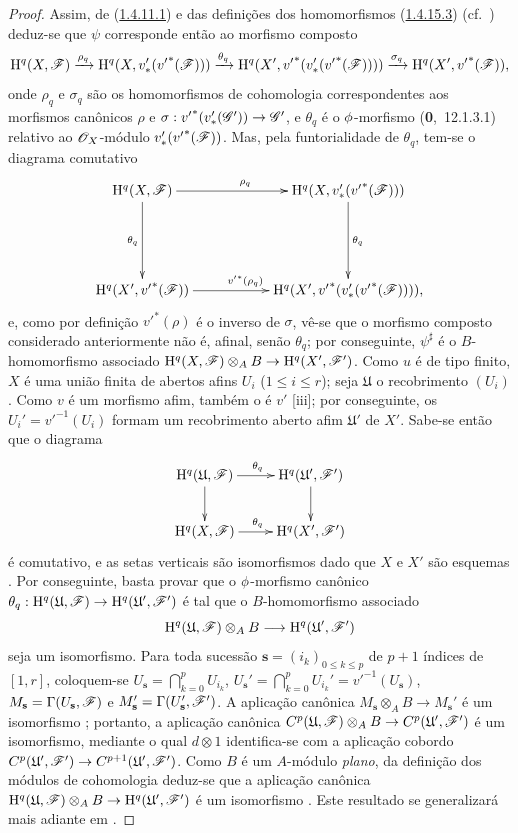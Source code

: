 \begin{proof}
Assim, de (\hyperref[III.1.4.11.1]{1.4.11.1}) e das definições dos homomorfismos (\hyperref[III.1.4.15.3]{1.4.15.3}) (cf.~) deduz-se que $\psi$ corresponde então ao morfismo composto
\[
  \mathrm{H}^q(X,\mathscr{F})\xrightarrow{\rho_q}\mathrm{H}^q(X,v_*'({v'}^*(\mathscr{F})))\xrightarrow{\theta_q}\mathrm{H}^q(X',{v'}^*(v_*'({v'}^*(\mathscr{F}))))\xrightarrow{\sigma_q}\mathrm{H}^q(X',{v'}^*(\mathscr{F})),
\]
onde $\rho_q$ e $\sigma_q$ são os homomorfismos de cohomologia correspondentes aos morfismos canônicos $\rho$ e $\sigma:{v'}^*(v_*'(\sh{G}'))\to\sh{G}'$, e $\theta_q$ é o $\phi$-morfismo (\textbf{0},~12.1.3.1) relativo ao $\mathscr{O}_X$-módulo $v_*'({v'}^*(\mathscr{F}))$.
Mas, pela funtorialidade de $\theta_q$, tem-se o diagrama comutativo
\[
  \xymatrix{
    \HH^q(X,\sh{F})\ar[rr]^{\rho_q}\ar[dd]_{\theta_q} & &
    \HH^q(X,v_*'({v'}^*(\sh{F})))\ar[dd]^{\theta_q}\\\\
    \HH^q(X',{v'}^*(\sh{F}))\ar[rr]^{{v'}^*(\rho_q)} & &
    \HH^q(X',{v'}^*(v_*'({v'}^*(\sh{F})))),
  }
\]
e, como por definição  ${v'}^*(\rho)$ é o inverso de $\sigma$, vê-se que o morfismo composto considerado anteriormente não é, afinal, senão $\theta_q$; por conseguinte, $\psi^\sharp$ é o $B$-homomorfismo associado $\HH^q(X,\sh{F})\otimes_A B\to\HH^q(X',\sh{F}')$.
Como $u$ é de tipo finito, $X$ é uma união finita de abertos afins $U_i$ ($1\leq i\leq r$); seja $\mathfrak{U}$ o recobrimento $(U_i)$.
Como $v$ é um morfismo afim, também o é $v'$ [iii]; por conseguinte, os $U_i'={v'}^{-1}(U_i)$ formam um recobrimento aberto afim $\mathfrak{U}'$ de $X'$.
Sabe-se então  que o diagrama
\[
  \xymatrix{
    \HH^q(\mathfrak{U},\sh{F})\ar[r]^{\theta_q}\ar[d] &
    \HH^q(\mathfrak{U}',\sh{F}')\ar[d]\\
    \HH^q(X,\sh{F})\ar[r]^{\theta_q} &
    \HH^q(X',\sh{F}')
  }
\]
é comutativo, e as setas verticais são isomorfismos dado que $X$ e $X'$ são esquemas .
Por conseguinte, basta provar que o $\phi$-morfismo canônico $\theta_q:\HH^q(\mathfrak{U},\sh{F})\to\HH^q(\mathfrak{U}',\sh{F}')$ é tal que o $B$-homomorfismo associado
\[
  \HH^q(\mathfrak{U},\sh{F})\otimes_A B\to\HH^q(\mathfrak{U}',\sh{F}')
\]
seja um isomorfismo.
Para toda sucessão $\mathbf{s}=(i_k)_{0\leq k\leq p}$ de $p+1$ índices de $[1,r]$, coloquem-se $U_\mathbf{s}=\bigcap_{k=0}^p U_{i_k}$, $U_\mathbf{s}'=\bigcap_{k=0}^p U_{i_k}'={v'}^{-1}(U_\mathbf{s})$, $M_\mathbf{s}=\Gamma(U_\mathbf{s},\mathscr{F})$ e $M_\mathbf{s}'=\Gamma(U_\mathbf{s}',\mathscr{F}')$.
A aplicação canônica $M_\mathbf{s}\otimes_A B\to M_\mathbf{s}'$ é um isomorfismo ; portanto, a aplicação canônica $C^p(\mathfrak{U},\sh{F})\otimes_A B\to C^p(\mathfrak{U}',\sh{F}')$ é um isomorfismo, mediante o qual $d\otimes 1$ identifica-se com a aplicação cobordo $C^p(\mathfrak{U}',\sh{F}')\to C^{p+1}(\mathfrak{U}',\sh{F}')$.
Como $B$ é um $A$-módulo \emph{plano}, da definição dos módulos de cohomologia deduz-se que a aplicação canônica $\HH^q(\mathfrak{U},\sh{F})\otimes_A B\to\HH^q(\mathfrak{U}',\sh{F}')$ é um isomorfismo .
Este resultado se generalizará mais adiante em .
\end{proof}


